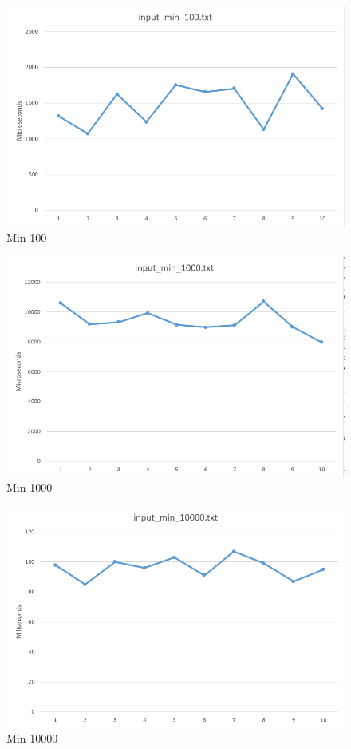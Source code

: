 \documentclass[a4paper, 12pt, titlepage]{article}
\begin{document}
\begin{figure}[H]
	\centering
	\caption{Min 100}
	\includegraphics[width=.75\textwidth]{min100.png} %
\end{figure}

\begin{figure}[H]
	\centering
	\caption{Min 1000}
	\includegraphics[width=.75\textwidth]{min1000.png} %
\end{figure}

\begin{figure}[H]
	\centering
	\caption{Min 10000}
	\includegraphics[width=.75\textwidth]{min10000.png} %
\end{figure}
\end{document}
